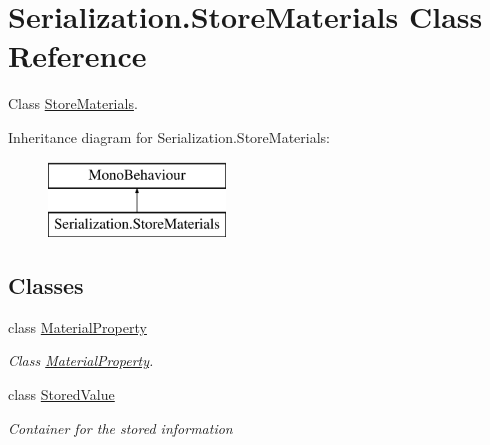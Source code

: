 \hypertarget{class_serialization_1_1_store_materials}{}\section{Serialization.\+Store\+Materials Class Reference}
\label{class_serialization_1_1_store_materials}


Class \hyperlink{class_serialization_1_1_store_materials}{Store\+Materials}.  


Inheritance diagram for Serialization.\+Store\+Materials\+:\begin{figure}[H]
\begin{center}
\leavevmode
\includegraphics[height=2.000000cm]{class_serialization_1_1_store_materials}
\end{center}
\end{figure}
\subsection*{Classes}
\begin{DoxyCompactItemize}
\item 
class \hyperlink{class_serialization_1_1_store_materials_1_1_material_property}{Material\+Property}
\begin{DoxyCompactList}\small\item\em Class \hyperlink{class_serialization_1_1_store_materials_1_1_material_property}{Material\+Property}. \end{DoxyCompactList}\item 
class \hyperlink{class_serialization_1_1_store_materials_1_1_stored_value}{Stored\+Value}
\begin{DoxyCompactList}\small\item\em Container for the stored information \end{DoxyCompactList}\end{DoxyCompactItemize}
